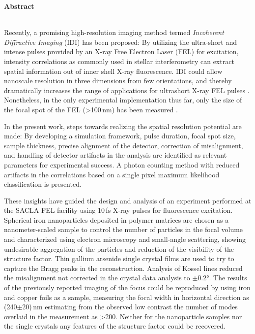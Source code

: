 	\begin{Huge}
		\textbf{Abstract}\vspace{12mm}
	\end{Huge}
\\
Recently, a promising high-resolution imaging method termed \textit{Incoherent Diffractive Imaging} (IDI) has been proposed: By utilizing the ultra-short and intense pulses provided by an X-ray Free Electron Laser (FEL) for excitation,  intensity correlations as commonly used in stellar interferometry can extract spatial information out of inner shell X-ray fluorescence.  IDI could allow nanoscale resolution in three dimensions from few orientations, and thereby dramatically increases the range of applications for ultrashort X-ray FEL pulses \cite{classen2017}. Nonetheless, in the only experimental implementation thus far, only the size of the focal spot of the FEL (>100\,nm) has been measured \cite{nakumura2020}.

In the present work, steps towards realizing the spatial resolution potential are made: By developing a simulation framework, pulse duration, focal spot size, sample thickness, precise alignment of the detector, correction of misalignment, and handling of detector artifacts in the analysis are identified as relevant parameters for experimental success. A photon counting method with reduced artifacts in the correlations based on a single pixel maximum likelihood classification is presented.

These insights have guided the design and analysis of an experiment performed at the SACLA FEL facility using 10\,fs X-ray pulses for fluorescence excitation.
Spherical iron nanoparticles deposited in polymer matrices are chosen as a nanometer-scaled sample to control the number of particles in the focal volume and characterized using electron microscopy and small-angle scattering, showing undesirable aggregation of the particles and reduction of the visibility of the structure factor. Thin gallium arsenide single crystal films are used to try to capture the Bragg peaks in the reconstruction. Analysis of Kossel lines reduced the misalignment not corrected in the crystal data analysis to $\pm$0.2°. 
The results of the previously reported imaging of the focus could be reproduced by using iron and copper foils as a sample, measuring the focal width in horizontal direction as (240$\pm$20)\,nm estimating from the observed low contrast the number of modes overlaid in the measurement as >200.  Neither for the nanoparticle samples nor the single crystals any features of the structure factor could be recovered.


